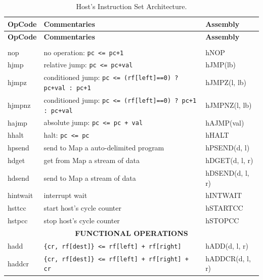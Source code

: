 \begin{table}[H]
\small
\centering
\begin{longtable}{|l|l|l|}
\caption{Host's Instruction Set Architecture.}
\label{tab:host_isa} \\
\hline
\textbf{OpCode} & \textbf{Commentaries} & \textbf{Assembly} \\
\hline
\endfirsthead
\hline
\textbf{OpCode} & \textbf{Commentaries} & \textbf{Assembly} \\
\hline
\endhead
\hline
\endfoot
\hline
\endlastfoot
\multicolumn{3}{|c|}{\textbf{CONTROL OPERATIONS}} \\
\hline
nop    & no operation: \texttt{pc <= pc+1}                            & hNOP          \\ \hline
hjmp   & relative jump: \texttt{pc <= pc+val}                         & hJMP(lb)      \\ \hline
hjmpz  & conditioned jump: \texttt{pc <= (rf[left]==0) ? pc+val : pc+1} & hJMPZ(l, lb)  \\ \hline
hjmpnz & conditioned jump: \texttt{pc <= (rf[left]==0) ? pc+1 : pc+val} & hJMPNZ(l, lb) \\ \hline
hajmp  & absolute jump: \texttt{pc <= pc + val}                       & hAJMP(val)    \\ \hline
hhalt  & halt: \texttt{pc <= pc}                                      & hHALT         \\ \hline
hpsend & send to Map a auto-delimited program                         & hPSEND(d, l)  \\ \hline
hdget  & get from Map a stream of data                                & hDGET(d, l, r) \\ \hline
hdsend & send to Map a stream of data                                 & hDSEND(d, l, r) \\ \hline
hintwait & interrupt wait                                             & hINTWAIT      \\ \hline
hsttcc & start host's cycle counter                                   & hSTARTCC      \\ \hline
hstpcc & stop host's cycle counter                                    & hSTOPCC       \\ \hline
\multicolumn{3}{|c|}{\textbf{FUNCTIONAL OPERATIONS}} \\
\hline
hadd   & \texttt{\{cr, rf[dest]\} <= rf[left] + rf[right]}            & hADD(d, l, r) \\ \hline
haddcr & \texttt{\{cr, rf[dest]\} <= rf[left] + rf[right] + cr}       & hADDCR(d, l, r) \\ \hline

\end{longtable}
\end{table}
